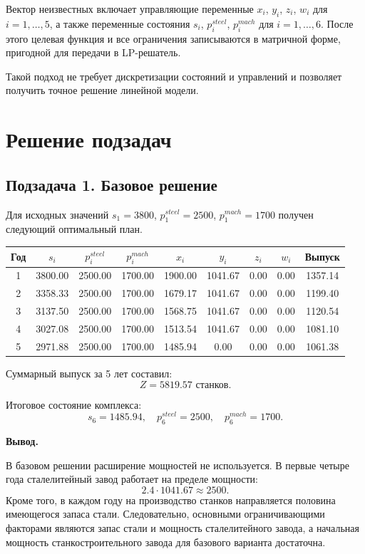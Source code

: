 \documentclass[a4paper,12pt]{article}
\begin{document}
Вектор неизвестных включает управляющие переменные $x_i$, $y_i$, $z_i$, $w_i$
для $i = 1,\dots,5$, а также переменные состояния $s_i$, $p_i^{steel}$,
$p_i^{mach}$ для $i = 1,\dots,6$. После этого целевая функция и все ограничения
записываются в матричной форме, пригодной для передачи в LP-решатель.

Такой подход не требует дискретизации состояний и управлений и позволяет
получить точное решение линейной модели.

\section{Решение подзадач}
\subsection{Подзадача 1. Базовое решение}

Для исходных значений $s_1 = 3800$, $p_1^{steel} = 2500$,
$p_1^{mach} = 1700$ получен следующий оптимальный план.

\begin{center}
\small
\begin{tabular}{ccccccccc}
\toprule
Год & $s_i$ & $p_i^{steel}$ & $p_i^{mach}$ & $x_i$ & $y_i$ & $z_i$ & $w_i$ & Выпуск \\
\midrule
1 & 3800.00 & 2500.00 & 1700.00 & 1900.00 & 1041.67 & 0.00 & 0.00 & 1357.14 \\
2 & 3358.33 & 2500.00 & 1700.00 & 1679.17 & 1041.67 & 0.00 & 0.00 & 1199.40 \\
3 & 3137.50 & 2500.00 & 1700.00 & 1568.75 & 1041.67 & 0.00 & 0.00 & 1120.54 \\
4 & 3027.08 & 2500.00 & 1700.00 & 1513.54 & 1041.67 & 0.00 & 0.00 & 1081.10 \\
5 & 2971.88 & 2500.00 & 1700.00 & 1485.94 & 0.00 & 0.00 & 0.00 & 1061.38 \\
\bottomrule
\end{tabular}
\end{center}

Суммарный выпуск за 5 лет составил:
\[
Z = 5819.57 \text{ станков}.
\]

Итоговое состояние комплекса:
\[
s_6 = 1485.94,\quad p_6^{steel} = 2500,\quad p_6^{mach} = 1700.
\]

\textbf{Вывод.}

В базовом решении расширение мощностей не используется. В первые четыре года
сталелитейный завод работает на пределе мощности:
\[
2.4 \cdot 1041.67 \approx 2500.
\]
Кроме того, в каждом году на производство станков направляется половина
имеющегося запаса стали. Следовательно, основными ограничивающими факторами
являются запас стали и мощность сталелитейного завода, а начальная мощность
станкостроительного завода для базового варианта достаточна.
\end{document}
